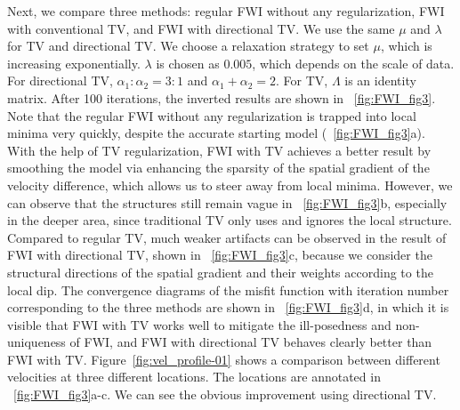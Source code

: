 Next, we compare three methods: regular FWI without any regularization, FWI with conventional TV, and FWI with directional TV. We use the same $\mu$ and $\lambda$ for TV and directional TV. We choose a relaxation strategy to set $\mu$, which is increasing exponentially. $\lambda$ is chosen as $0.005$, which depends on the scale of data. For directional TV, $\alpha_1 : \alpha_2 = 3 : 1$ and $\alpha_1 + \alpha_2 = 2$. For TV, $\Lambda$ is an identity matrix. After 100 iterations, the inverted results are shown in ~\ref{fig:FWI_fig3}. Note that the regular FWI without any regularization is trapped into local minima very quickly, despite the accurate starting model (~\ref{fig:FWI_fig3}a). With the help of TV regularization, FWI with TV achieves a better result by smoothing the model via enhancing the sparsity of the spatial gradient of the velocity difference, which allows us to steer away from local minima. However, we can observe that the structures still remain vague in ~\ref{fig:FWI_fig3}b, especially in the deeper area, since traditional TV only uses  and ignores the local structure. Compared to  regular TV, much weaker artifacts can be observed in the result of FWI with  directional TV, shown in ~\ref{fig:FWI_fig3}c, because we consider the structural directions of the spatial gradient and their weights according to the local dip. The convergence diagrams of the misfit function with iteration number corresponding to the three methods are shown in ~\ref{fig:FWI_fig3}d, in which it is visible that FWI with TV works well to mitigate the ill-posedness and non-uniqueness of FWI, and FWI with directional TV behaves clearly better than FWI with  TV. Figure~\ref{fig:vel_profile-01} shows a comparison between  different velocities at three different locations. The locations are annotated in ~\ref{fig:FWI_fig3}a-c. We can see the obvious improvement using directional TV. 

